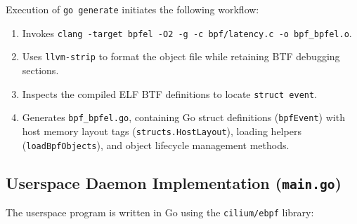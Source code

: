 \documentclass[11pt,a4paper]{article}
\begin{document}
Execution of \texttt{go generate} initiates the following workflow:
\begin{enumerate}
    \item Invokes \texttt{clang -target bpfel -O2 -g -c bpf/latency.c -o bpf\_bpfel.o}.
    \item Uses \texttt{llvm-strip} to format the object file while retaining BTF debugging sections.
    \item Inspects the compiled ELF BTF definitions to locate \texttt{struct event}.
    \item Generates \texttt{bpf\_bpfel.go}, containing Go struct definitions (\texttt{bpfEvent}) with host memory layout tags (\texttt{structs.HostLayout}), loading helpers (\texttt{loadBpfObjects}), and object lifecycle management methods.
\end{enumerate}

\subsection{Userspace Daemon Implementation (\texttt{main.go})}
The userspace program is written in Go using the \texttt{cilium/ebpf} library:
\end{document}
